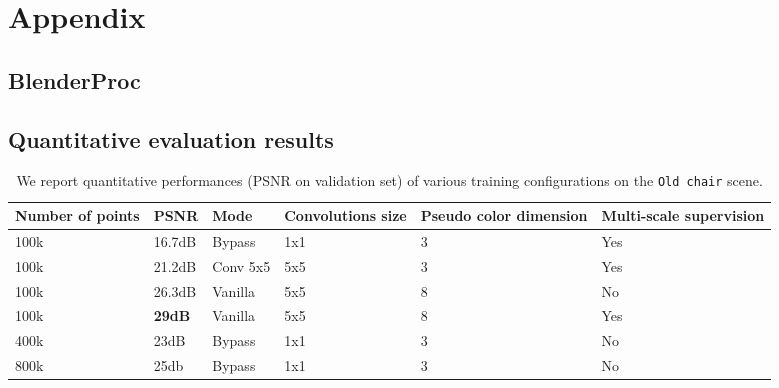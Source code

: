 \section{Appendix}
\subsection{BlenderProc}
\label{app:blender_proc}


\subsection*{Quantitative evaluation results}


\begin{table*}[]
    \begin{tabular}{|l|l|l|l|l|l|}
    \hline
    Number of points & PSNR   & Mode     & Convolutions size & Pseudo color dimension & Multi-scale supervision \\ \hline
    100k             & 16.7dB & Bypass   & 1x1               & 3                      & Yes                     \\ \hline
    100k             & 21.2dB & Conv 5x5 & 5x5               & 3                      & Yes                     \\ \hline
    100k             & 26.3dB & Vanilla  & 5x5               & 8                      & No                      \\ \hline
    100k             & \textbf{29dB}   & Vanilla  & 5x5               & 8                      & Yes                     \\ \hline
    400k             & 23dB   & Bypass   & 1x1               & 3                      & No                      \\ \hline
    800k             & 25db   & Bypass   & 1x1               & 3                      & No                      \\ \hline
\end{tabular}
\caption{We report quantitative performances (PSNR on validation set) of various training configurations on the \texttt{Old chair} scene.}
\label{tab:results}
\end{table*}